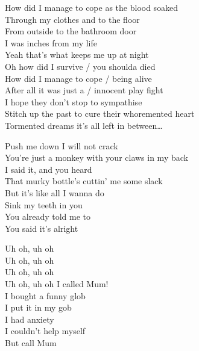 How did I manage to cope as the blood soaked\\
Through my clothes and to the floor\\
From outside to the bathroom door\\
I was inches from my life\\
Yeah that's what keeps me up at night\\

Oh how did I survive / you shoulda died\\
How did I manage to cope / being alive\\
After all it was just a / innocent play fight\\
I hope they don't stop to sympathise\\

Stitch up the past to cure their whoremented heart\\

Tormented dreams it's all left in between…\\




Push me down I will not crack\\
You're just a monkey with your claws in my back\\
I said it, and you heard\\
That murky bottle's cuttin' me some slack\\

But it's like all I wanna do\\
Sink my teeth in you\\
You already told me to\\
You said it's alright\\




Uh oh, uh oh\\
Uh oh, uh oh\\
Uh oh, uh oh\\
Uh oh, uh oh I called Mum!\\

I bought a funny glob\\
I put it in my gob\\
I had anxiety\\
I couldn't help myself\\
But call Mum\\

